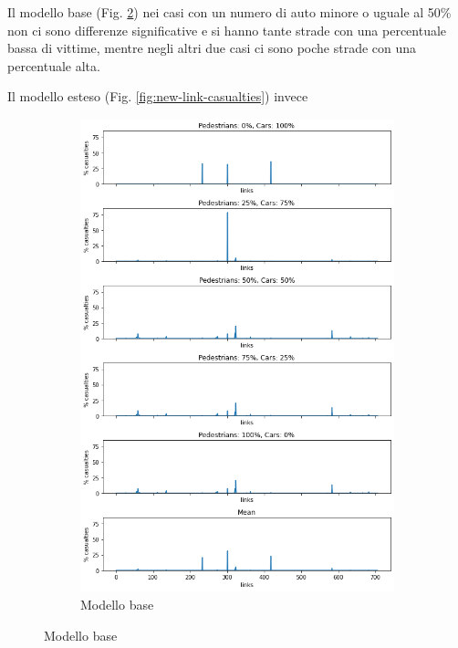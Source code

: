 Il modello base (Fig. \ref{fig:base-link-casualties}) nei casi con un numero di auto minore o uguale al 50\%
non ci sono differenze significative e si hanno tante strade con una percentuale bassa di vittime, 
mentre negli altri due casi ci sono poche strade con una percentuale alta.

Il modello esteso (Fig. \ref{fig:new-link-casualties}) invece %

\begin{figure}[ht]
    \centering
    \begin{subfigure}{0.475\textwidth}
        \centering
        \includegraphics[width=\textwidth]{images/analisi/base_links_casualties}
        \caption{Modello base}
        \label{fig:base-link-casualties}
    \end{subfigure}

\end{figure}
